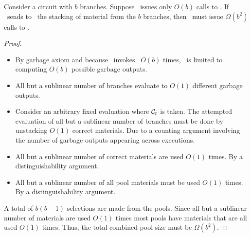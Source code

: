 \begin{theorem}
Consider a circuit with $b$ branches.  Suppose \Gen\ issues only
$O(b)$ calls to \Ev. If \Gen\ sends to \Eval\ the stacking of material from
the $b$ branches, then \Gen\ must issue $\Omega(b^2)$  calls to \Gb.
\end{theorem}
\begin{proof}


  \begin{itemize}
    \item
      By garbage axiom and because \Gen\ invokes \Ev\ $O(b)$
      times, \Eval\ is limited to computing $O(b)$ possible garbage
      outputs.
    \item
      All but a sublinear number of branches evaluate to $O(1)$
      different garbage outputs.
    \item
      Consider an arbitrary fixed evaluation where $\mathcal C_t$ is taken.
      The attempted evaluation of all but a sublinear number of
      branches must be done by unstacking $O(1)$ correct materials.
      Due to a counting argument involving the number of garbage
      outputs appearing across executions.
    \item
      All but a sublinear number of correct materials are used
      $O(1)$ times. By a distinguishability argument.
    \item
      All but a sublinear number of all pool materials must be used
      $O(1)$ times.
      By a distinguishability argument.
  \end{itemize}

  A total of $b(b-1)$ selections are made from the pools. Since all
  but a sublinear number of materials are used $O(1)$ times most pools
  have materials that are all used $O(1)$ times.
  Thus, the total combined pool size must be $\Omega(b^2)$.
\end{proof}
